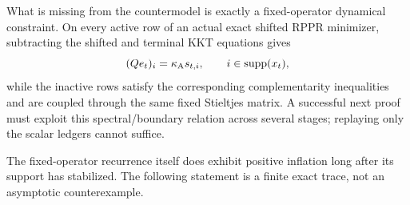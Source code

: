 What is missing from the countermodel is exactly a fixed-operator dynamical
constraint.  On every active row of an actual exact shifted RPPR minimizer,
subtracting the shifted and terminal KKT equations gives
\begin{equation}
 (Qe_t)_i=\kappa_{\mathrm A}s_{t,i},
 \qquad i\in\operatorname{supp}(x_t),
 \label{eq:aesp-cd-fixed-operator-relation}
\end{equation}
while the inactive rows satisfy the corresponding complementarity
inequalities and are coupled through the same fixed Stieltjes matrix.  A
successful next proof must exploit this spectral/boundary relation across
several stages; replaying only the scalar ledgers cannot suffice.

The fixed-operator recurrence itself does exhibit positive inflation long
after its support has stabilized.  The following statement is a finite exact
trace, not an asymptotic counterexample.

